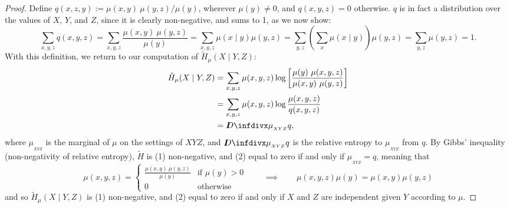 {\begin{proof}
Define $q(x,z,y) := {\mu(x,y)\ \mu(y,z) }/{\mu(y)}$, wherever
			$\mu(y)\neq 0$, and $q(x,y,z) = 0$ otherwise. $q$ is in fact
	a distribution over the values of $X$, $Y$, and $Z$, since it  
is clearly non-negative, and sums to 1, as we now show:
\[
\sum_{x,y,z} q(x,y, z) = \sum_{x,y,z} \frac{\mu(x,y)\ \mu(y,z)}{\mu(y)}
= \sum_{x,y,z} \mu(x \mid y) \mu(y,z)
= \sum_{y,z} \left(\sum_x \mu(x \mid y)\right) \mu(y,z)
= \sum_{y,z}  \mu(y,z)
		= 1.
\]	
With this definition, we return to our computation of $\tilde H_\mu(X \mid Y, Z)$:
\begin{align*}
	\tilde H_\mu(X \mid Y, Z) &= \sum_{x,y, z}  \mu(x,y ,z) \log \left[\frac{\mu(y)\ \mu(x,y,z)}{\mu(x,y)\ \mu(y,z)} \right]  \\ %
	&= \sum_{x,y, z}  \mu(x,y ,z) \log \frac{\mu(x,y,z)}{q(x,y,z)}  \\
					&= \kldiv{\mu_{_{XYZ}}}{q},
\end{align*}
where $\mu_{_{XYZ}}$ is the marginal of $\mu$ on the settings of $XYZ$, and $\kldiv{\mu_{_{XYZ}}}{q}$ is the relative entropy to $\mu_{_{XYZ}}$ from $q$. By Gibbs' inequality (non-negativity of relative entropy), $\tilde H$ is  (1) non-negative, and (2) equal to zero if and only if $\mu_{_{XYZ}} = q$, meaning that 
\[  \mu(x,y,z) =\begin{cases} \frac{\mu(x,y)\ \mu(y,z)}{\mu(y)} & \text{if }\mu(y) > 0\\ 0 & \text{otherwise} \end{cases} \qquad \implies \qquad \mu(x,y,z) \mu(y) = \mu(x,y) \mu(y, z) \] 
and so $\tilde H_\mu(X \mid Y, Z)$ is (1) non-negative, and
	(2) equal to zero if and only if $X$ and $Z$ are independent
			given $Y$ according to $\mu$. 
\end{proof}
}
	
